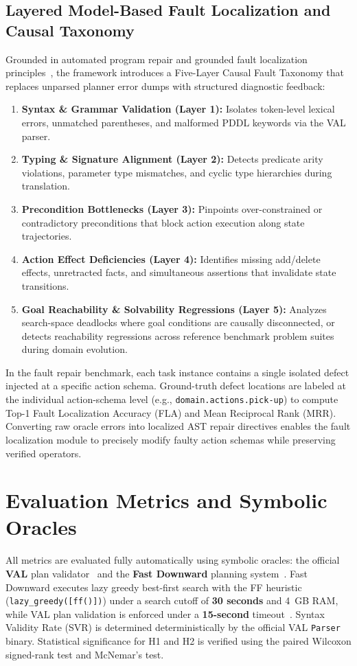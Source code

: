 \documentclass[11pt,a4paper]{article}
\begin{document}
\subsection{Layered Model-Based Fault Localization and Causal Taxonomy}
Grounded in automated program repair and grounded fault localization principles~\cite{ozayturk2025autostructor, rosa2026grounded}, the framework introduces a Five-Layer Causal Fault Taxonomy that replaces unparsed planner error dumps with structured diagnostic feedback:
\begin{enumerate}[label=(\arabic*), nosep, leftmargin=2em]
    \item \textbf{Syntax \& Grammar Validation (Layer 1):} Isolates token-level lexical errors, unmatched parentheses, and malformed PDDL keywords via the VAL parser.
    \item \textbf{Typing \& Signature Alignment (Layer 2):} Detects predicate arity violations, parameter type mismatches, and cyclic type hierarchies during translation.
    \item \textbf{Precondition Bottlenecks (Layer 3):} Pinpoints over-constrained or contradictory preconditions that block action execution along state trajectories.
    \item \textbf{Action Effect Deficiencies (Layer 4):} Identifies missing add/delete effects, unretracted facts, and simultaneous assertions that invalidate state transitions.
    \item \textbf{Goal Reachability \& Solvability Regressions (Layer 5):} Analyzes search-space deadlocks where goal conditions are causally disconnected, or detects reachability regressions across reference benchmark problem suites during domain evolution.
\end{enumerate}
In the fault repair benchmark, each task instance contains a single isolated defect injected at a specific action schema. Ground-truth defect locations are labeled at the individual action-schema level (e.g., \texttt{domain.actions.pick-up}) to compute Top-1 Fault Localization Accuracy (FLA) and Mean Reciprocal Rank (MRR). Converting raw oracle errors into localized AST repair directives enables the fault localization module to precisely modify faulty action schemas while preserving verified operators.

\section{Evaluation Metrics and Symbolic Oracles}
All metrics are evaluated fully automatically using symbolic oracles: the official \textbf{VAL} plan validator~\cite{howey2004val} and the \textbf{Fast Downward} planning system~\cite{Helmert_2006}. Fast Downward executes lazy greedy best-first search with the FF heuristic (\texttt{lazy\_greedy([ff()])}) under a search cutoff of \textbf{30 seconds} and 4~GB RAM, while VAL plan validation is enforced under a \textbf{15-second} timeout~\cite{howey2004val}. Syntax Validity Rate (SVR) is determined deterministically by the official VAL \texttt{Parser} binary. Statistical significance for H1 and H2 is verified using the paired Wilcoxon signed-rank test and McNemar's test.
\end{document}
